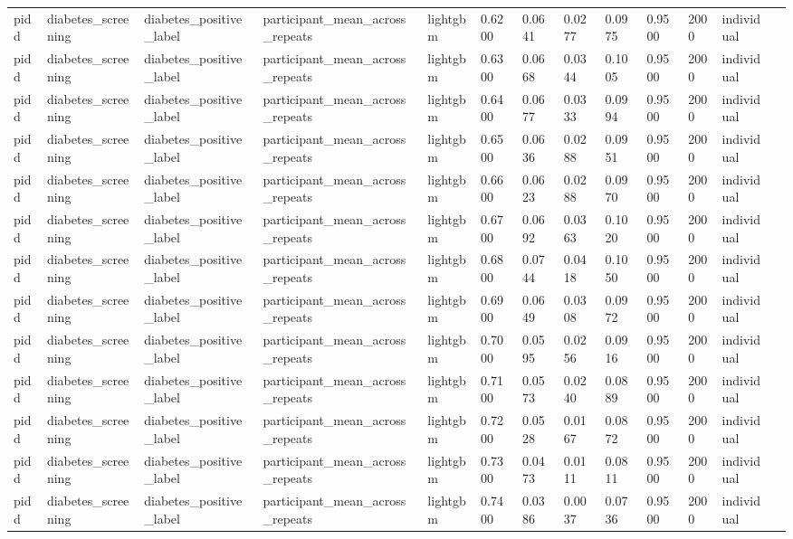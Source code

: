 \begin{tabular}{lllllllllllll}
pidd & diabetes\_screening & diabetes\_positive\_label & participant\_mean\_across\_repeats & lightgbm & 0.6200 & 0.0641 & 0.0277 & 0.0975 & 0.9500 & 2000 & individual &  \\
pidd & diabetes\_screening & diabetes\_positive\_label & participant\_mean\_across\_repeats & lightgbm & 0.6300 & 0.0668 & 0.0344 & 0.1005 & 0.9500 & 2000 & individual &  \\
pidd & diabetes\_screening & diabetes\_positive\_label & participant\_mean\_across\_repeats & lightgbm & 0.6400 & 0.0677 & 0.0333 & 0.0994 & 0.9500 & 2000 & individual &  \\
pidd & diabetes\_screening & diabetes\_positive\_label & participant\_mean\_across\_repeats & lightgbm & 0.6500 & 0.0636 & 0.0288 & 0.0951 & 0.9500 & 2000 & individual &  \\
pidd & diabetes\_screening & diabetes\_positive\_label & participant\_mean\_across\_repeats & lightgbm & 0.6600 & 0.0623 & 0.0288 & 0.0970 & 0.9500 & 2000 & individual &  \\
pidd & diabetes\_screening & diabetes\_positive\_label & participant\_mean\_across\_repeats & lightgbm & 0.6700 & 0.0692 & 0.0363 & 0.1020 & 0.9500 & 2000 & individual &  \\
pidd & diabetes\_screening & diabetes\_positive\_label & participant\_mean\_across\_repeats & lightgbm & 0.6800 & 0.0744 & 0.0418 & 0.1050 & 0.9500 & 2000 & individual &  \\
pidd & diabetes\_screening & diabetes\_positive\_label & participant\_mean\_across\_repeats & lightgbm & 0.6900 & 0.0649 & 0.0308 & 0.0972 & 0.9500 & 2000 & individual &  \\
pidd & diabetes\_screening & diabetes\_positive\_label & participant\_mean\_across\_repeats & lightgbm & 0.7000 & 0.0595 & 0.0256 & 0.0916 & 0.9500 & 2000 & individual &  \\
pidd & diabetes\_screening & diabetes\_positive\_label & participant\_mean\_across\_repeats & lightgbm & 0.7100 & 0.0573 & 0.0240 & 0.0889 & 0.9500 & 2000 & individual &  \\
pidd & diabetes\_screening & diabetes\_positive\_label & participant\_mean\_across\_repeats & lightgbm & 0.7200 & 0.0528 & 0.0167 & 0.0872 & 0.9500 & 2000 & individual &  \\
pidd & diabetes\_screening & diabetes\_positive\_label & participant\_mean\_across\_repeats & lightgbm & 0.7300 & 0.0473 & 0.0111 & 0.0811 & 0.9500 & 2000 & individual &  \\
pidd & diabetes\_screening & diabetes\_positive\_label & participant\_mean\_across\_repeats & lightgbm & 0.7400 & 0.0386 & 0.0037 & 0.0736 & 0.9500 & 2000 & individual &  \\

\end{tabular}
